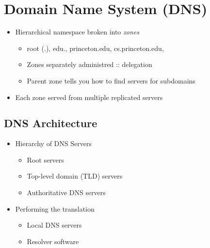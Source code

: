 \section{Domain Name System (DNS)}
\begin{figure}[H]
\end{figure}
\begin{itemize}[nosep]
    \item Hierarchical namespace broken into \emph{zones}
          \begin{itemize}[nosep]
              \item root (.), edu., princeton.edu, cs.princeton.edu,
              \item Zones separately administred :: delegation
              \item Parent zone tells you how to find servers for subdomains
          \end{itemize}
    \item Each zone served from multiple replicated servers
\end{itemize}
\subsection{DNS Architecture}
\begin{itemize}[nosep]
    \item Hierarchy of DNS Servers
          \begin{itemize}[nosep]
              \item Root servers
              \item Top-level domain (TLD) servers
              \item Authoritative DNS servers
          \end{itemize}
    \item Performing the translation
          \begin{itemize}[nosep]
              \item Local DNS servers
              \item Resolver software
          \end{itemize}
\end{itemize}
